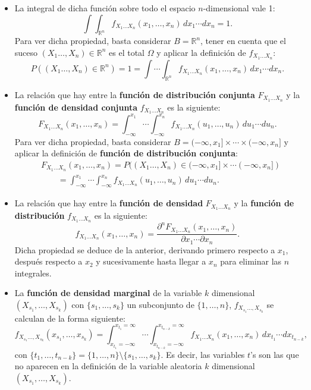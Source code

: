 \documentclass[
  letterpaper,
  DIV=11,
  numbers=noendperiod]{scrreprt}
\begin{document}
\begin{itemize}
\item
  La integral de dicha función sobre todo el espacio \(n\)-dimensional
  vale 1: \[
  \int\int_{\mathbb{R}^n} f_{X_1\ldots X_n}(x_1,\ldots,x_n)\,dx_1\cdots dx_n =1.
  \] Para ver dicha propiedad, basta considerar \(B=\mathbb{R}^n\),
  tener en cuenta que el suceso \((X_1\ldots,X_n)\in \mathbb{R}^n\) es
  el total \(\Omega\) y aplicar la definición de \(f_{X_1\ldots X_n}\):
  \[
  P((X_1\ldots,X_n)\in \mathbb{R}^n)=1= \int\cdots\int_{\mathbb{R}^n} f_{X_1\ldots X_n}(x_1,\ldots,x_n)\,dx_1\cdots dx_n.
  \]
\item
  La relación que hay entre la \textbf{función de distribución conjunta}
  \(F_{X_1\ldots X_n}\) y la \textbf{función de densidad conjunta}
  \(f_{X_1\ldots X_n}\) es la siguiente: \[
  F_{X_1\ldots X_n}(x_1,\ldots,x_n)=\int_{-\infty}^{x_1}\cdots\int_{-\infty}^{x_n} f_{X_1\ldots X_n}(u_1,\ldots,u_n)\,du_1\cdots du_n.
  \] Para ver dicha propiedad, basta considerar
  \(B=(-\infty,x_1]\times\cdots\times (-\infty,x_n]\) y aplicar la
  definición de \textbf{función de distribución conjunta}: \[
  \begin{array}{rl}
  & F_{X_1\ldots X_n}(x_1,\ldots,x_n)=P((X_1\ldots,X_n)\in (-\infty,x_1]\times\cdots (-\infty,x_n])\\ &\qquad =\int_{-\infty}^{x_1}\cdots\int_{-\infty}^{x_n} f_{X_1\ldots X_n}(u_1,\ldots,u_n)\,du_1\cdots du_n.
  \end{array}
  \]
\item
  La relación que hay entre la \textbf{función de densidad}
  \(F_{X_1\ldots X_n}\) y la \textbf{función de distribución}
  \(f_{X_1\ldots X_n}\) es la siguiente: \[
  f_{X_1\ldots X_n}(x_1,\ldots,x_n)=\frac{\partial^n F_{X_1\ldots X_n}(x_1,\ldots,x_n)}{\partial x_1\cdots\partial x_n}.
  \] Dicha propiedad se deduce de la anterior, derivando primero
  respecto a \(x_1\), después respecto a \(x_2\) y sucesivamente hasta
  llegar a \(x_n\) para eliminar las \(n\) integrales.
\item
  La \textbf{función de densidad marginal} de la variable \(k\)
  dimensional \((X_{s_1},\ldots,X_{s_k})\) con \(\{s_1,\ldots, s_k\}\)
  un subconjunto de \(\{1,\ldots,n\}\), \(f_{X_{s_1}\ldots,X_{s_k}}\) se
  calculan de la forma siguiente: \[
  f_{X_{s_1}\ldots,X_{s_k}}(x_{s_1},\ldots,x_{s_k})=\int_{x_{t_1}=-\infty}^{x_{t_1}=\infty}\cdots \int_{x_{t_{n-k}}=-\infty}^{x_{t_{n-k}}=\infty} f_{X_1\ldots X_n}(x_1,\ldots,x_n)\, dx_{t_1}\cdots dx_{t_{n-k}},
  \] con
  \(\{t_1,\ldots,t_{n-k}\}=\{1,\ldots,n\}\setminus \{s_1,\ldots,s_k\}.\)
  Es decir, las variables \(t\)'s son las que no aparecen en la
  definición de la variable aleatoria \(k\) dimensional
  \((X_{s_1},\ldots,X_{s_k})\).
\end{itemize}
\end{document}
